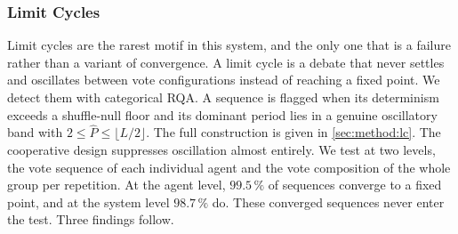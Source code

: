 \subsubsection{Limit Cycles}
\label{sec:results:lc}

Limit cycles are the rarest motif in this system, and the only one that is a failure
rather than a variant of convergence. A limit cycle is a debate that never settles and
oscillates between vote configurations instead of reaching a fixed point. We detect
them with categorical \ac{RQA}. A sequence is flagged when its
determinism exceeds a shuffle-null floor and its dominant period lies in a genuine
oscillatory band with $2 \leq \hat{P} \leq \lfloor L/2 \rfloor$. The full construction
is given in \autoref{sec:method:lc}. The cooperative design suppresses oscillation
almost entirely. We test at two levels, the vote sequence of each individual agent
and the vote composition of the whole group per repetition. At the agent level,
$99.5\,\%$ of sequences converge to a fixed point, and at the system level
$98.7\,\%$ do. These converged sequences never enter the test. Three findings follow.

